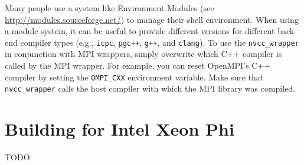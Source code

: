 Many people use a system like Environment Modules (see \\ \url{http://modules.sourceforge.net/}) to manage their shell environment.
When using a module system, it can be useful to provide different versions for different back-end compiler types (e.g., \verb!icpc!, \verb!pgc++!, \verb!g++!, and \verb!clang!).
To use the \lstinline|nvcc_wrapper| in conjunction with MPI wrappers, simply overwrite which C++ compiler is called by the MPI wrapper. 
For example, you can reset OpenMPI's C++ compiler by setting the \lstinline|OMPI_CXX| environment variable.
Make sure that \lstinline|nvcc_wrapper| calls the host compiler with which the MPI library was compiled.

\section{Building for Intel Xeon Phi}\label{S:build:Phi}

TODO